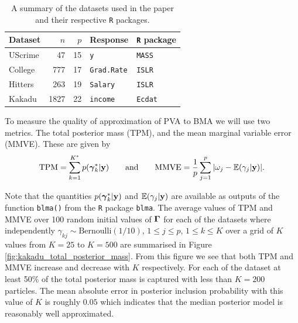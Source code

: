 \begin{table}[ht!]
	\begin{center}
		\begin{tabular}{l|r|r|l|l}
			Dataset	& $n$ & $p$ & Response & {\tt R} package \\ 
			\hline 
			UScrime 	& 47 & 15 &  {\tt y} & {\tt MASS} \\  
			College &  777   & 17      &  {\tt Grad.Rate}      & {\tt ISLR} \\ 
			Hitters	& 263 & 19 & {\tt Salary} & {\tt ISLR} \\ 
			Kakadu	& 1827 & 22 & {\tt income} & {\tt Ecdat}   \\  
		\end{tabular} 
	\end{center} \bigskip 
	\caption{A summary of the datasets used in the paper and their respective {\tt R} packages.}
	\label{tab:cva_datasets}
\end{table}

\noindent To measure the quality of approximation of PVA to BMA we will use two
metrics. The total posterior mass (TPM), and the mean marginal variable error
(MMVE). These are given by $$ \displaystyle \mbox{TPM} = \sum_{k=1}^{K^*}
p({\boldsymbol \gamma}_k^*|{\bf y}) \qquad \mbox{and}  \qquad \mbox{MMVE} = \frac{1}{p}
\sum_{j=1}^p |\omega_j - {\mathbb E}(\gamma_j|{\bf y}) |.  $$

\noindent Note that the quantities $p({\boldsymbol \gamma}_k^*|{\bf y})$ and ${\mathbb E}(\gamma_j|{\bf y})$
are available as outputs of the function {\tt blma()} from the {\tt R} package
{\tt blma}.  The average values of TPM and MMVE over 100 random initial values
of ${\boldsymbol \Gamma}$ for each of the datasets where independently $\gamma_{kj} \sim
\mbox{Bernoulli}(1/10)$, $1\le j\le p$, $1\le k\le K$ over a grid of $K$ values
from $K=25$ to $K=500$ are summarised in Figure
\ref{fig:kakadu_total_posterior_mass}.  From this figure we see that both TPM
and MMVE increase and decrease with $K$ respectively. For each of the dataset
at least 50\% of the total posterior mass is captured with less than $K=200$
particles.  The mean absolute error in posterior inclusion probability with
this value of $K$ is roughly $0.05$ which indicates that the median posterior
model is reasonably well approximated.

	
